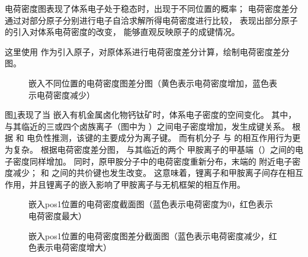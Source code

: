 电荷密度图表现了体系电子处于稳态时，出现于不同位置的概率；
电荷密度差分通过对部分原子分别进行电子自洽求解所得电荷密度进行比较，
表现出部分原子的引入对体系电荷密度的改变，
能够直观反映原子的成键情况。

这里使用 作为引入原子，对原体系进行电荷密度差分计算，绘制电荷密度差分图。

\begin{figure}[htbp]
    \centering
    \caption{嵌入不同位置的电荷密度图差分图（黄色表示电荷密度增加，蓝色表示电荷密度减少）}
    \label{fig:111-pos-chgdiff}
\end{figure}

图\ref{fig:111-pos-chgdiff}表现了当 嵌入有机金属卤化物钙钛矿时，体系电子密度的空间变化。
其中，与其临近的三或四个卤族离子（图中为 ）之间电子密度增加，发生成键关系。
根据 和 电负性推测，该键的主要成分为离子键。
而有机分子  与 的相互作用行为更为复杂。
根据电荷密度差分图， 与其临近的两个 甲胺离子的甲基端（）之间的电子密度同样增加。
同时，原甲胺分子中的电荷密度重新分布，末端的 附近电子密度减少；
和  之间的共价键也发生改变。
这意味着，锂离子和甲胺离子间存在相互作用，并且锂离子的嵌入影响了甲胺离子与无机框架的相互作用。

\begin{figure}[htbp]
    \centering
    \caption{嵌入pos1位置的电荷密度截面图（蓝色表示电荷密度为0，红色表示电荷密度最大）}
    \label{fig:111-pos1-chg}
\end{figure}

\begin{figure}[htbp]
    \centering
    \caption{嵌入pos1位置的电荷密度图差分截面图（蓝色表示电荷密度减少，红色表示电荷密度增大）}
    \label{fig:111-pos1-diffchg}
\end{figure}

